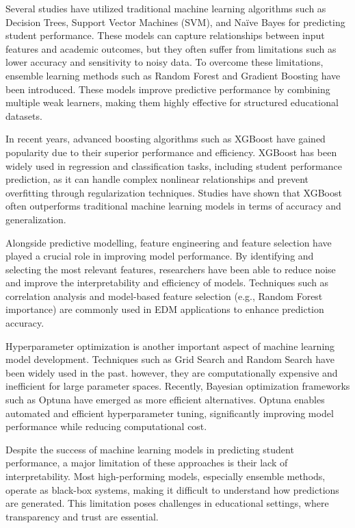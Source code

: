 \documentclass[conference]{IEEEtran}
\begin{document}
Several studies have utilized traditional machine learning algorithms such as Decision Trees, Support Vector Machines (SVM), and Naïve Bayes for predicting student performance. These models can capture relationships between input features and academic outcomes, but they often suffer from limitations such as lower accuracy and sensitivity to noisy data. To overcome these limitations, ensemble learning methods such as Random Forest and Gradient Boosting have been introduced. These models improve predictive performance by combining multiple weak learners, making them highly effective for structured educational datasets. 

In recent years, advanced boosting algorithms such as XGBoost have gained popularity due to their superior performance and efficiency. XGBoost has been widely used in regression and classification tasks, including student performance prediction, as it can handle complex nonlinear relationships and prevent overfitting through regularization techniques. Studies have shown that XGBoost often outperforms traditional machine learning models in terms of accuracy and generalization. 

Alongside predictive modelling, feature engineering and feature selection have played a crucial role in improving model performance. By identifying and selecting the most relevant features, researchers have been able to reduce noise and improve the interpretability and efficiency of models. Techniques such as correlation analysis and model-based feature selection (e.g., Random Forest importance) are commonly used in EDM applications to enhance prediction accuracy. 

Hyperparameter optimization is another important aspect of machine learning model development. Techniques such as Grid Search and Random Search have been widely used in the past. however, they are computationally expensive and inefficient for large parameter spaces. Recently, Bayesian optimization frameworks such as Optuna have emerged as more efficient alternatives. Optuna enables automated and efficient hyperparameter tuning, significantly improving model performance while reducing computational cost. 

Despite the success of machine learning models in predicting student performance, a major limitation of these approaches is their lack of interpretability. Most high-performing models, especially ensemble methods, operate as black-box systems, making it difficult to understand how predictions are generated. This limitation poses challenges in educational settings, where transparency and trust are essential. 
\end{document}
